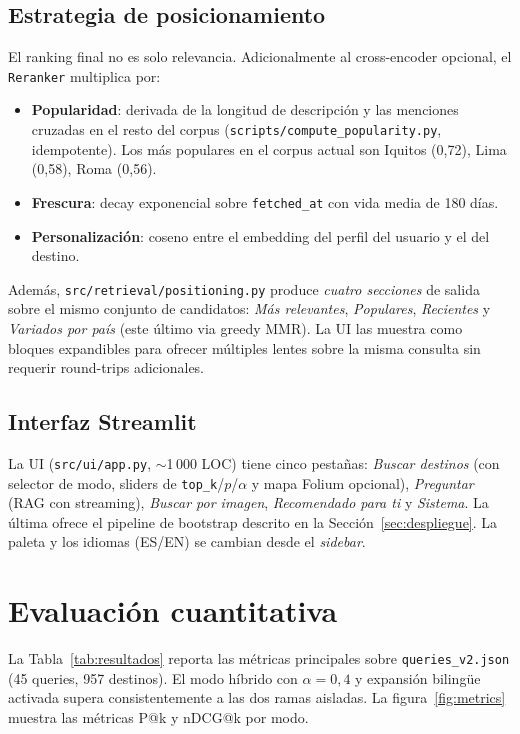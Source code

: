 \documentclass[runningheads,a4paper]{llncs}
\begin{document}
\subsection{Estrategia de posicionamiento}

El ranking final no es solo relevancia. Adicionalmente al cross-encoder opcional, el \texttt{Reranker} multiplica por:

\begin{itemize}
\item \textbf{Popularidad}: derivada de la longitud de descripci\'on y las menciones cruzadas en el resto del corpus (\texttt{scripts/compute\_popularity.py}, idempotente). Los m\'as populares en el corpus actual son Iquitos (0{,}72), Lima (0{,}58), Roma (0{,}56).
\item \textbf{Frescura}: decay exponencial sobre \texttt{fetched\_at} con vida media de 180 d\'ias.
\item \textbf{Personalizaci\'on}: coseno entre el embedding del perfil del usuario y el del destino.
\end{itemize}

Adem\'as, \texttt{src/retrieval/positioning.py} produce \emph{cuatro secciones} de salida sobre el mismo conjunto de candidatos: \emph{M\'as relevantes}, \emph{Populares}, \emph{Recientes} y \emph{Variados por pa\'is} (este \'ultimo via greedy MMR). La UI las muestra como bloques expandibles para ofrecer m\'ultiples lentes sobre la misma consulta sin requerir round-trips adicionales.

\subsection{Interfaz Streamlit}

La UI (\texttt{src/ui/app.py}, $\sim$1\,000 LOC) tiene cinco pesta\~nas: \emph{Buscar destinos} (con selector de modo, sliders de \texttt{top\_k}/$p$/$\alpha$ y mapa Folium opcional), \emph{Preguntar} (RAG con streaming), \emph{Buscar por imagen}, \emph{Recomendado para ti} y \emph{Sistema}. La \'ultima ofrece el pipeline de bootstrap descrito en la Secci\'on~\ref{sec:despliegue}. La paleta y los idiomas (ES/EN) se cambian desde el \emph{sidebar}.

\section{Evaluaci\'on cuantitativa}
\label{sec:eval}

La Tabla~\ref{tab:resultados} reporta las m\'etricas principales sobre \texttt{queries\_v2.json} (45 queries, 957 destinos). El modo h\'ibrido con $\alpha{=}0{,}4$ y expansi\'on bilingüe activada supera consistentemente a las dos ramas aisladas. La figura~\ref{fig:metrics} muestra las m\'etricas P@k y nDCG@k por modo.
\end{document}
